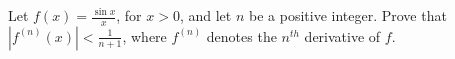 \documentclass{article}
\begin{document}
\setlength{\parindent}{0pt}
Let $f(x) = \frac{\sin x}{x}$, for $x > 0$, and let $n$ be a positive integer. Prove that $\left|f^{(n)}(x)\right| < \frac{1}{n + 1}$, where $f^{(n)}$ denotes the $n^{th}$ derivative of $f$.
\end{document}
